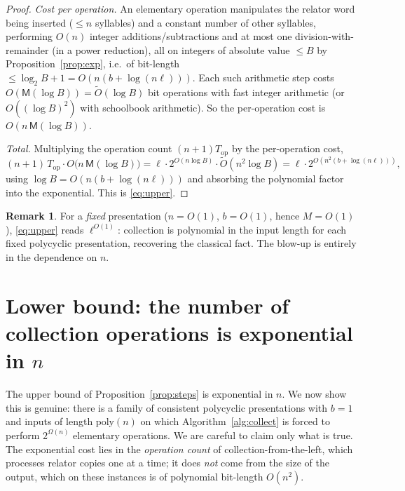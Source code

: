 \documentclass{amsart}
\theoremstyle{definition}
\newtheorem{remark}{Remark}
\begin{document}
\begin{proof}
\emph{Cost per operation.} An elementary operation manipulates the relator word being inserted
($\le n$ syllables) and a constant number of other syllables, performing $O(n)$ integer
additions/subtractions and at most one division-with-remainder (in a power reduction), all on
integers of absolute value $\le B$ by Proposition~\ref{prop:exp}, i.e.\ of bit-length $\le
\log_2 B+1=O(n(b+\log(n\ell)))$. Each such arithmetic step costs $O(\mathsf M(\log B))=
\widetilde O(\log B)$ bit operations with fast integer arithmetic (or $O((\log B)^2)$ with
schoolbook arithmetic). So the per-operation cost is $O(n\,\mathsf M(\log B))$.

\emph{Total.} Multiplying the operation count $(n+1)T_{\mathrm{op}}$ by the per-operation cost,
\[
(n+1)\,T_{\mathrm{op}}\cdot O\!\bigl(n\,\mathsf M(\log B)\bigr)
=\ell\cdot 2^{O(n\log B)}\cdot \widetilde O(n^2\log B)
=\ell\cdot 2^{O(n^2(b+\log(n\ell)))},
\]
using $\log B=O(n(b+\log(n\ell)))$ and absorbing the polynomial factor into the exponential.
This is \eqref{eq:upper}.
\end{proof}

\begin{remark}
For a \emph{fixed} presentation ($n=O(1)$, $b=O(1)$, hence $M=O(1)$), \eqref{eq:upper} reads
$\ell^{O(1)}$: collection is polynomial in the input length for each fixed polycyclic
presentation, recovering the classical fact. The blow-up is entirely in the dependence on $n$.
\end{remark}

\section{Lower bound: the number of collection operations is exponential in $n$}\label{sec:lower}

The upper bound of Proposition~\ref{prop:steps} is exponential in $n$. We now show this is
genuine: there is a family of consistent polycyclic presentations with $b=1$ and inputs of
length $\mathrm{poly}(n)$ on which Algorithm~\ref{alg:collect} is forced to perform $2^{\Omega(n)}$
elementary operations. We are careful to claim only what is true. The exponential cost lies in
the \emph{operation count} of collection-from-the-left, which processes relator copies one at a
time; it does \emph{not} come from the size of the output, which on these instances is of
polynomial bit-length $O(n^2)$.
\end{document}
